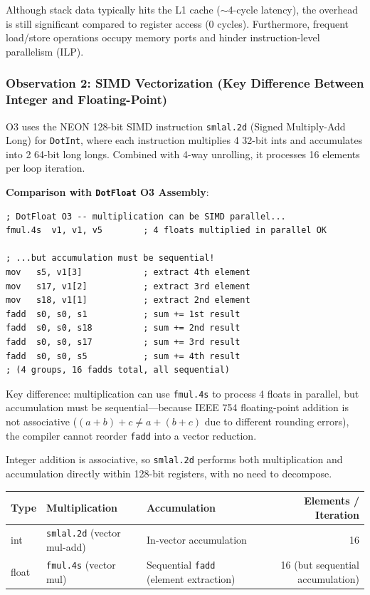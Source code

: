 \documentclass[12pt,a4paper]{article}
\begin{document}
Although stack data typically hits the L1 cache ($\sim$4-cycle latency), the overhead is still significant compared to register access (0 cycles). Furthermore, frequent load/store operations occupy memory ports and hinder instruction-level parallelism (ILP).

\subsubsection{Observation 2: SIMD Vectorization (Key Difference Between Integer and Floating-Point)}

O3 uses the NEON 128-bit SIMD instruction \texttt{smlal.2d} (Signed Multiply-Add Long) for \texttt{DotInt}, where each instruction multiplies 4 32-bit ints and accumulates into 2 64-bit long longs. Combined with 4-way unrolling, it processes 16 elements per loop iteration.

\textbf{Comparison with \texttt{DotFloat} O3 Assembly}:

\begin{lstlisting}
; DotFloat O3 -- multiplication can be SIMD parallel...
fmul.4s  v1, v1, v5        ; 4 floats multiplied in parallel OK

; ...but accumulation must be sequential!
mov   s5, v1[3]            ; extract 4th element
mov   s17, v1[2]           ; extract 3rd element
mov   s18, v1[1]           ; extract 2nd element
fadd  s0, s0, s1           ; sum += 1st result
fadd  s0, s0, s18          ; sum += 2nd result
fadd  s0, s0, s17          ; sum += 3rd result
fadd  s0, s0, s5           ; sum += 4th result
; (4 groups, 16 fadds total, all sequential)
\end{lstlisting}

Key difference: multiplication can use \texttt{fmul.4s} to process 4 floats in parallel, but accumulation must be sequential---because IEEE 754 floating-point addition is not associative ($(a+b)+c \neq a+(b+c)$ due to different rounding errors), the compiler cannot reorder \texttt{fadd} into a vector reduction.

Integer addition is associative, so \texttt{smlal.2d} performs both multiplication and accumulation directly within 128-bit registers, with no need to decompose.

\begin{table}[H]
\centering
\begin{tabular}{l l l r}
\toprule
Type & Multiplication & Accumulation & Elements / Iteration \\
\midrule
int & \texttt{smlal.2d} (vector mul-add) & In-vector accumulation & 16 \\
float & \texttt{fmul.4s} (vector mul) & Sequential \texttt{fadd} (element extraction) & 16 (but sequential accumulation) \\
\bottomrule
\end{tabular}
\end{table}
\end{document}
